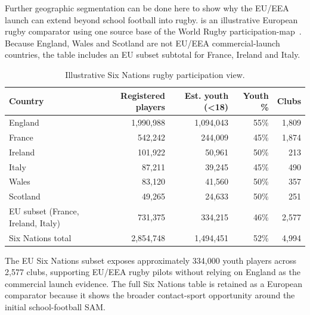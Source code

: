 Further geographic segmentation can be done here to show why the EU/EEA launch can extend beyond school football into rugby.  is an illustrative European rugby comparator using one source base of the World Rugby participation-map~\cite{worldrugby2020participationmap}. Because England, Wales and Scotland are not EU/EEA commercial-launch countries, the table includes an EU subset subtotal for France, Ireland and Italy.

\begin{table}[htbp]
    \centering
    \footnotesize
    \caption{Illustrative Six Nations rugby participation view.}
    \label{tab:ent-six-nations-rugby}
    \begin{tabular}{lrrrr}
        \toprule
        \textbf{Country} & \textbf{Registered players} & \textbf{Est. youth (<18)} & \textbf{Youth \%} & \textbf{Clubs} \\
        \midrule
        England     & 1,990,988 & 1,094,043 & 55\% & 1,809 \\
        France      &   542,242 &   244,009 & 45\% & 1,874 \\
        Ireland     &   101,922 &    50,961 & 50\% &   213 \\
        Italy       &    87,211 &    39,245 & 45\% &   490 \\
        Wales       &    83,120 &    41,560 & 50\% &   357 \\
        Scotland    &    49,265 &    24,633 & 50\% &   251 \\
        \midrule
        EU subset (France, Ireland, Italy) &   731,375 &   334,215 & 46\% & 2,577 \\
        Six Nations total & 2,854,748 & 1,494,451 & 52\% & 4,994 \\
        \bottomrule
    \end{tabular}
\end{table}

The EU Six Nations subset exposes approximately 334,000 youth players across 2,577 clubs, supporting EU/EEA rugby pilots without relying on England as the commercial launch evidence. The full Six Nations table is retained as a European comparator because it shows the broader contact-sport opportunity around the initial school-football SAM.


